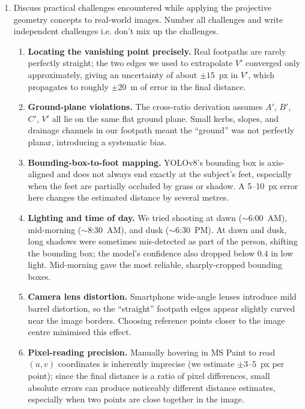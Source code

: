 \documentclass[11pt]{article}
\newenvironment{studentSpace}{\itshape}{}
\begin{document}
\begin{enumerate}
\item Discuss practical challenges encountered while applying the projective
geometry concepts to real-world images. Number all challenges and write independent challenges i.e. don't mix up the challenges.
\begin{studentSpace}
\begin{enumerate}
\item \textbf{Locating the vanishing point precisely.} Real footpaths
  are rarely perfectly straight; the two edges we used to extrapolate
  $V'$ converged only approximately, giving an uncertainty of about
  $\pm 15$~px in $V'$, which propagates to roughly $\pm 20$~m of error
  in the final distance.

\item \textbf{Ground-plane violations.} The cross-ratio derivation
  assumes $A'$, $B'$, $C'$, $V'$ all lie on the same flat ground plane.
  Small kerbs, slopes, and drainage channels in our footpath meant the
  ``ground'' was not perfectly planar, introducing a systematic bias.

\item \textbf{Bounding-box-to-foot mapping.} YOLOv8's bounding box is
  axis-aligned and does not always end exactly at the subject's feet,
  especially when the feet are partially occluded by grass or shadow.
  A 5--10~px error here changes the estimated distance by several
  metres.

\item \textbf{Lighting and time of day.} We tried shooting at dawn
  ($\sim$6:00~AM), mid-morning ($\sim$8:30~AM), and dusk
  ($\sim$6:30~PM). At dawn and dusk, long shadows were sometimes
  mis-detected as part of the person, shifting the bounding box; the
  model's confidence also dropped below $0.4$ in low light. Mid-morning
  gave the most reliable, sharply-cropped bounding boxes.

\item \textbf{Camera lens distortion.} Smartphone wide-angle lenses
  introduce mild barrel distortion, so the ``straight'' footpath edges
  appear slightly curved near the image borders. Choosing reference
  points closer to the image centre minimised this effect.

\item \textbf{Pixel-reading precision.} Manually hovering in MS Paint
  to read $(u,v)$ coordinates is inherently imprecise (we estimate
  $\pm 3$--$5$~px per point); since the final distance is a ratio of
  pixel differences, small absolute errors can produce noticeably
  different distance estimates, especially when two points are close
  together in the image.
\end{enumerate}
\end{studentSpace}



\end{enumerate}
\end{document}
